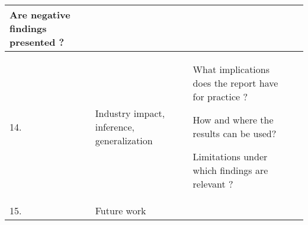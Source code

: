 {\begin{tabular}{|>{\raggedright}p{}|>{\raggedright}p{}|>{\raggedright}p{}|>{\raggedright}p{}|}
Are negative findings presented \cite{Kitchenham2007}? & \tabularnewline
\hline 
14. & Industry impact, inference, generalization & What implications does the report have for practice \cite{Kitchenham2007}?

How and where the results can be used?

Limitations under which findings are relevant \cite{Jedlitschka2005}? & \tabularnewline
\hline 
15. & Future work &  & \tabularnewline
\hline

\end{tabular}
} %

